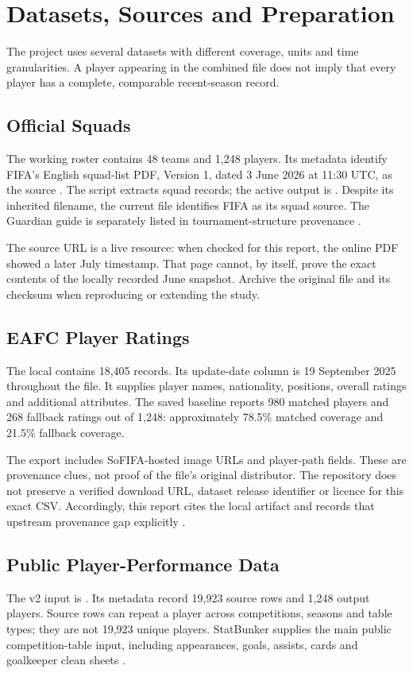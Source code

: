 \documentclass[11pt,a4paper]{article}
\begin{document}
\section{Datasets, Sources and Preparation}
\label{sec:data}
The project uses several datasets with different coverage, units and time
granularities. A player appearing in the combined file does not imply that
every player has a complete, comparable recent-season record.
\subsection{Official Squads}
The working roster contains 48 teams and 1,248 players. Its metadata identify
FIFA's English squad-list PDF, Version 1, dated 3 June 2026 at 11:30 UTC, as the
source \cite{data-fifa-squads}. The script
 extracts squad records; the active output
is . Despite its inherited
filename, the current file identifies FIFA as its squad source. The Guardian
guide is separately listed in tournament-structure provenance \cite{data-guardian}.

The source URL is a live resource: when checked for this report, the online PDF
showed a later July timestamp. That page cannot, by itself, prove the exact
contents of the locally recorded June snapshot. Archive the original file and
its checksum when reproducing or extending the study.
\subsection{EAFC Player Ratings}
The local  contains 18,405 records. Its update-date
column is 19 September 2025 throughout the file. It supplies player names,
nationality, positions, overall ratings and additional attributes. The saved
baseline reports 980 matched players and 268 fallback ratings out of 1,248:
approximately 78.5\% matched coverage and 21.5\% fallback coverage.

The export includes SoFIFA-hosted image URLs and player-path fields. These are
provenance clues, not proof of the file's original distributor. The repository
does not preserve a verified download URL, dataset release identifier or licence
for this exact CSV. Accordingly, this report cites the local artifact and
records that upstream provenance gap explicitly \cite{data-eafc}.
\subsection{Public Player-Performance Data}
The v2 input is . Its metadata
record 19,923 source rows and 1,248 output players. Source rows can repeat a
player across competitions, seasons and table types; they are not 19,923 unique
players. StatBunker supplies the main public competition-table input, including
appearances, goals, assists, cards and goalkeeper clean sheets \cite{data-statbunker}.
\end{document}
